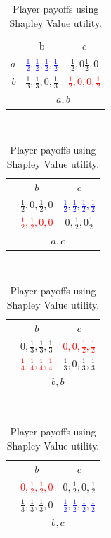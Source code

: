 \documentclass[defaultstyle,12pt]{proposal}
\begin{document}
\begin{table}[!htb]
	\centering\begin{tabular}{r|c|c|}
	\multicolumn{1}{c}{}
	& \multicolumn{1}{c}{b}
	& \multicolumn{1}{c}{$c$}\\
	\cline{2-3}
	$a$ & \textcolor{blue}{$\frac{1}{2},\frac{1}{2},\frac{1}{2},\frac{1}{2}$} & $\frac{1}{2},0\frac{1}{2},0$\\
	\cline{2-3}
	$b$ & $\frac{1}{3},\frac{1}{3},0,\frac{1}{3}$ & \textcolor{red}{$\frac{1}{2},0,0,\frac{1}{2}$}\\
	\cline{2-3}
	\multicolumn{1}{c}{}
	& \multicolumn{2}{c}{$a,b$}
	\end{tabular}~
	\centering\begin{tabular}{r|c|c|}
	\multicolumn{1}{c}{}
	& \multicolumn{1}{c}{$b$}
	& \multicolumn{1}{c}{$c$}\\
	\cline{2-3}
	& $\frac{1}{2},0,\frac{1}{2},0$ & \textcolor{blue}{$\frac{1}{2},\frac{1}{2},\frac{1}{2},\frac{1}{2}$} \\
	\cline{2-3}
	& \textcolor{red}{$\frac{1}{2},\frac{1}{2},0,0$} & $0,\frac{1}{2},0\frac{1}{2}$ \\
	\cline{2-3}
	\multicolumn{1}{c}{}
	& \multicolumn{2}{c}{$a,c$}
	\end{tabular}~
	\centering\begin{tabular}{r|c|c|}
	\multicolumn{1}{c}{}
	& \multicolumn{1}{c}{$b$}
	& \multicolumn{1}{c}{$c$}\\
	\cline{2-3}
	& $0,\frac{1}{3},\frac{1}{3},\frac{1}{3}$ & \textcolor{red}{$0,0,\frac{1}{2},\frac{1}{2}$}\\
	\cline{2-3}
	& \textcolor{red}{$\frac{1}{4},\frac{1}{4},\frac{1}{4},\frac{1}{4}$} & $\frac{1}{3},0,\frac{1}{3},\frac{1}{3}$\\
	\cline{2-3}
	\multicolumn{1}{c}{}
	& \multicolumn{2}{c}{$b,b$}
	\end{tabular}~
	\centering\begin{tabular}{r|c|c|}
	\multicolumn{1}{c}{}
	& \multicolumn{1}{c}{$b$}
	& \multicolumn{1}{c}{$c$}\\
	\cline{2-3}
	& \textcolor{red}{$0,\frac{1}{2},\frac{1}{2},0$} & $0,\frac{1}{2},0,\frac{1}{2}$\\
	\cline{2-3}
	& $\frac{1}{3},\frac{1}{3},\frac{1}{3},0$ & \textcolor{blue}{$\frac{1}{2},\frac{1}{2},\frac{1}{2},\frac{1}{2}$}\\
	\cline{2-3}
	\multicolumn{1}{c}{}
	& \multicolumn{2}{c}{$b,c$}
	\end{tabular}
	\centering\caption{Player payoffs using Shapley Value utility.}\label{tab:svUtil}
\end{table}
\end{document}
